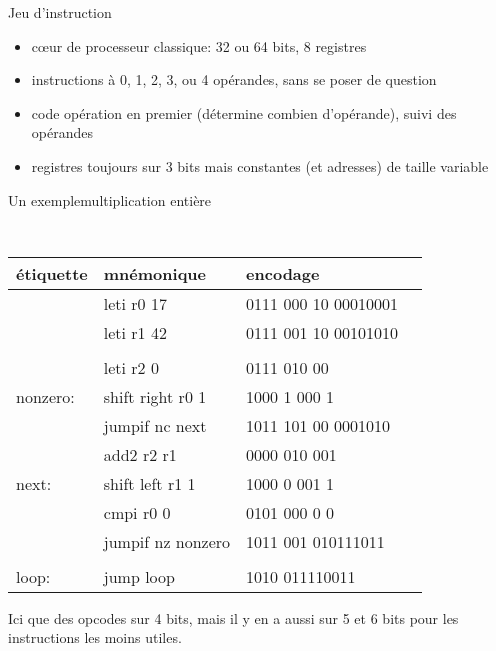 \documentclass[slidetop,11pt,table]{beamer}
\begin{document}
\begin{frame}{Jeu d'instruction}
  \begin{itemize}
  \item cœur de processeur classique: 32 ou 64 bits, 8 registres
  \item instructions à 0, 1, 2, 3, ou 4 opérandes, sans se poser de question
  \item code opération en premier (détermine combien d'opérande), suivi des opérandes
  \item registres toujours sur 3 bits mais constantes (et adresses) de taille variable
  \end{itemize}
\end{frame}



\begin{frame}{Un exemple}{multiplication entière}
  \begin{center}
    \tt\small
    \begin{tabular}{llll}
    \textrm{étiquette} & \textrm{mnémonique} & \textrm{encodage}\\
    \hline
    
				 & leti	r0 17				 & 0111 000 10 00010001 \\
				 & leti	r1 42				 & 0111 001 10 00101010 \\
				 &									 &										 \\
				 & leti	r2 0				 & 0111 010 00				 \\
nonzero: & shift	right r0 1 & 1000 1 000 1				 \\
				 & jumpif	nc next		 & 1011 101 00 0001010	 \\
				 & add2	r2 r1				 & 0000 010 001				 \\
next:		 & shift	left r1 1	 & 1000 0 001 1				 \\
				 & cmpi	r0 0				 & 0101 000 0 0				 \\
				 & jumpif	nz nonzero & 1011 001 010111011	 \\
				 &									 &										 \\
loop:		 & jump	loop				 & 1010 011110011			 \\
  \end{tabular}
\end{center}
Ici que des opcodes sur 4 bits, mais il y en a aussi sur 5 et 6 bits pour les instructions les moins utiles.
\end{frame}
\end{document}
